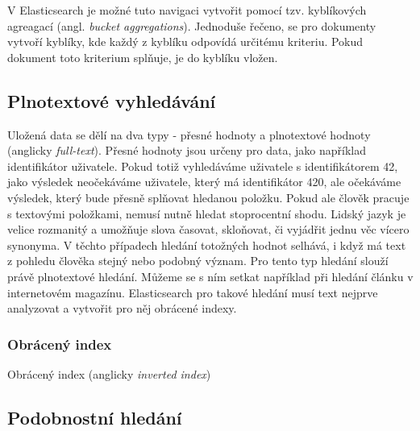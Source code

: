 V Elasticsearch je možné tuto navigaci vytvořit pomocí tzv. kyblíkových agreagací (angl. \emph{bucket aggregations}).
Jednoduše řečeno, se pro dokumenty vytvoří kyblíky, kde každý z kyblíku odpovídá určitému kriteriu. Pokud dokument toto kriterium splňuje, je do kyblíku vložen.

\subsection{Plnotextové vyhledávání}
Uložená data se dělí na dva typy - přesné hodnoty a plnotextové hodnoty (anglicky \emph{full-text}). Přesné hodnoty jsou určeny pro data, jako například identifikátor uživatele. Pokud totiž vyhledáváme uživatele s identifikátorem 42, jako výsledek neočekáváme uživatele, který má identifikátor 420, ale očekáváme výsledek, který bude přesně splňovat hledanou položku.
Pokud ale člověk pracuje s textovými položkami, nemusí nutně hledat stoprocentní shodu. Lidský jazyk je velice rozmanitý a umožňuje slova časovat, skloňovat, či vyjádřit jednu věc vícero synonyma. %
V těchto případech hledání totožných hodnot selhává, i když má text z pohledu člověka stejný nebo podobný význam. Pro tento typ hledání slouží právě plnotextové hledání. Můžeme se s ním setkat například při hledání článku v internetovém magazínu.
Elasticsearch pro takové hledání musí text nejprve analyzovat a vytvořit pro něj obrácené indexy.

\subsubsection*{Obrácený index}
Obrácený index (anglicky \emph{inverted index})
\blindtext[2]

\subsection{Podobnostní hledání}
\blindtext[2]